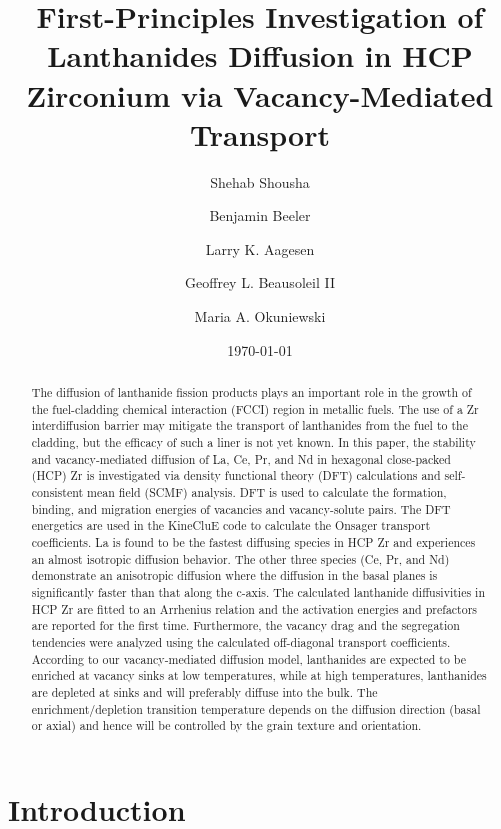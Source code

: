 \documentclass[preprint,12pt]{elsarticle}
\title{First-Principles Investigation of Lanthanides Diffusion in HCP Zirconium via Vacancy-Mediated Transport}
\author[inst1]{Shehab Shousha}
\affiliation[inst1]{organization={North Carolina State University},%
            city={Raleigh},
            postcode={27695}, 
            state={NC},
            country={United States}}
\author[inst1,inst2]{Benjamin Beeler}
\affiliation[inst2]{organization={Idaho National Laboratory},%
            city={Idaho Falls},
            postcode={83415}, 
            state={ID},
            country={United States}}
\author[inst2,inst3]{Larry K. Aagesen}
\affiliation[inst3]{organization={Department of Nuclear Engineering and Radiological Sciences, University of Michigan},%
            city={Ann Arbor},
            postcode={48109}, 
            state={MI},
            country={United States}}
\author[inst2]{Geoffrey L. Beausoleil II}
\author[inst4]{Maria A. Okuniewski}
\affiliation[inst4]{organization={Purdue University},%
            city={West Lafayette},
            postcode={47907}, 
            state={IN},
            country={United States}}
\date{\today}
\begin{document}
\begin{abstract}

The diffusion of lanthanide fission products plays an important role in the growth of the fuel-cladding chemical interaction (FCCI) region in metallic fuels. The use of a Zr interdiffusion barrier may mitigate the transport of lanthanides from the fuel to the cladding, but the efficacy of such a liner is not yet known. In this paper,  the stability and vacancy-mediated diffusion of La, Ce, Pr, and Nd in hexagonal close-packed (HCP) Zr is investigated via density functional theory (DFT) calculations and self-consistent mean field (SCMF) analysis. DFT is used to calculate the formation, binding, and migration energies of vacancies and vacancy-solute pairs. The DFT energetics are used in the KineCluE code to calculate the Onsager transport coefficients. La is found to be the fastest diffusing species in HCP Zr and experiences an almost isotropic diffusion behavior. The other three species (Ce, Pr, and Nd) demonstrate an anisotropic diffusion where the diffusion in the basal planes is significantly faster than that along the c-axis. The calculated lanthanide diffusivities in HCP Zr are fitted to an Arrhenius relation and the activation energies and prefactors are reported for the first time. Furthermore, the vacancy drag and the segregation tendencies were analyzed using the calculated off-diagonal transport coefficients. According to our vacancy-mediated diffusion model, lanthanides are expected to be enriched at vacancy sinks at low temperatures, while at high temperatures, lanthanides are depleted at sinks and will preferably diffuse into the bulk. The enrichment/depletion transition temperature depends on the diffusion direction (basal or axial) and hence will be controlled by the grain texture and orientation.

\end{abstract}

\maketitle

\section{Introduction}
\end{document}

